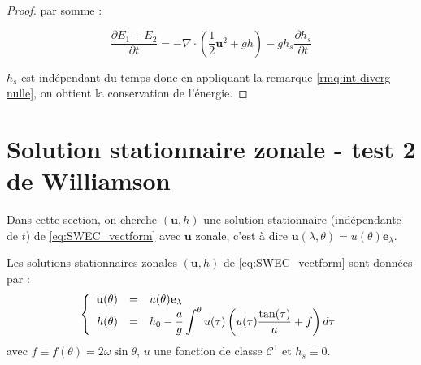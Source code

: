 \begin{proof}
par somme :

$$
\dfrac{\partial E_1 + E_2}{\partial t} = - \nabla \cdot \left( \dfrac{1}{2} \mathbf{u}^2 + gh \right) - g h_s \dfrac{\partial h_s}{\partial t} 
$$

$h_s$ est indépendant du temps donc en appliquant la remarque \ref{rmq:int diverg nulle}, on obtient la conservation de l'énergie.
\end{proof}

\section{Solution stationnaire zonale -  test 2 de Williamson}

Dans cette section, on cherche $(\mathbf{u},h)$ une solution stationnaire (indépendante de $t$) de \eqref{eq:SWEC_vectform} avec $\mathbf{u}$ zonale, c'est à dire $\mathbf{u}(\lambda, \theta) = u(\theta) \mathbf{e}_{\lambda}$.

\begin{proposition}
Les solutions stationnaires zonales $(\mathbf{u},h)$ de \eqref{eq:SWEC_vectform} sont données par :
\begin{equation}
\left\lbrace
\begin{array}{rcl}
\mathbf{u}(\theta) & = & u(\theta) \mathbf{e}_{\lambda}\\
h(\theta) & = & h_0 - \dfrac{a}{g} \displaystyle\int^{\theta} u(\tau) \left( u(\tau) \dfrac{\tan (\tau)}{a} + f \right) d\tau\\
\end{array}
\right.
\label{eq:sol. stationaire zonale de swe}
\end{equation}
avec $f \equiv f(\theta) = 2 \omega \sin \theta$, $u$ une fonction de classe $\mathcal{C}^1$ et $h_s \equiv 0$.
\end{proposition}

